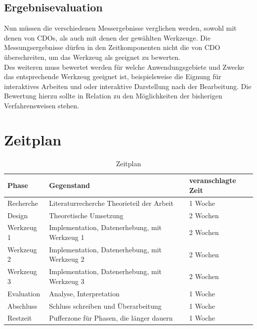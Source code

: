 \documentclass[
	12pt,
	a4paper,
	BCOR10mm,
	DIV14,
	listof=totoc,
	bibliography=totoc,
	headsepline
]{scrreprt}
\begin{document}
\section{Ergebnisevaluation}
Nun müssen die verschiedenen Messergebnisse verglichen werden, sowohl mit denen von CDOs, als auch mit denen der gewählten Werkzeuge.
Die Messungsergebnisse dürfen in den Zeitkomponenten nicht die von CDO überschreiten, um das Werkzeug als geeignet zu bewerten. \\
Des weiteren muss bewertet werden für welche Anwendungsgebiete und Zwecke das entsprechende Werkzeug geeignet ist, beispielsweise die Eignung für interaktives Arbeiten und oder interaktive Darstellung nach der Bearbeitung. 
Die Bewertung hierzu sollte in Relation zu den Möglichkeiten der bisherigen Verfahrensweisen stehen.


\chapter{Zeitplan}
\label{Zeitplan}
\begin{table}[h]
\begin{center}
\begin{tabular} {|l|p{4cm}|l|}
	\hline
	\textbf{Phase} & \textbf{Gegenstand} & \textbf{veranschlagte Zeit} \\ \hline
	Recherche & Literaturrecherche \newline Theorieteil der Arbeit & 1 Woche \\ \hline
	Design & Theoretische Umsetzung & 2 Wochen \\ \hline
	Werkzeug 1 & Implementation, \newline Datenerhebung, mit Werkzeug 1 & 2 Wochen \\ \hline
	Werkzeug 2 & Implementation, \newline Datenerhebung, mit Werkzeug 2 & 2 Wochen \\ \hline
	Werkzeug 3 & Implementation, \newline Datenerhebung, mit Werkzeug 3 & 2 Wochen \\ \hline
	Evaluation & Analyse, \newline Interpretation & 1 Woche \\ \hline
	Abschluss & Schluss schreiben und Überarbeitung & 1 Woche \\ \hline
	Restzeit & Pufferzone für Phasen, die länger dauern & 1 Woche \\ \hline
\end{tabular}
\end{center}
\caption{Zeitplan}
\label{tab:timeplan}
\end{table}
\end{document}
